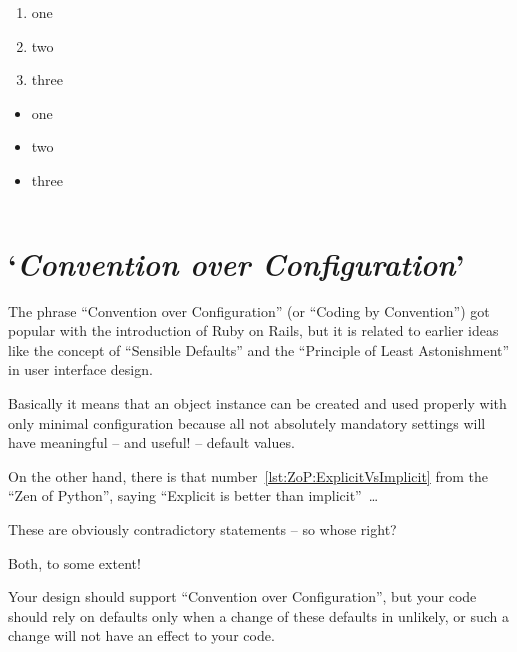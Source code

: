 \begin{enumerate}[label=P\arabic*.]
\item{one}
\item{two}
\item{three}
\end{enumerate}

\begin{itemize}[nosep]
\item{one}
\item{two}
\item{three}
\end{itemize}

\begin{lstlisting}[numbers=left]
\end{lstlisting}



\section{‘\textit{Convention over Configuration}’}
The phrase “Convention over Configuration” (or “Coding by Convention”) got popular with the introduction of Ruby on Rails, but it is related to earlier ideas like the concept of “Sensible Defaults” and the “Principle of Least Astonishment” in user interface design.

Basically it means that an object instance can be created and used properly with only minimal configuration because all not absolutely mandatory settings will have meaningful – and useful! – default values.

On the other hand, there is that number~\ref{lst:ZoP:ExplicitVsImplicit} from the “Zen of Python”, saying “Explicit is better than implicit”~…

These are obviously contradictory statements – so whose right?

Both, to some extent!

Your design should support “Convention over Configuration”, but your code should rely on defaults only when a change of these defaults in unlikely, or such a change will not have an effect to your code.

